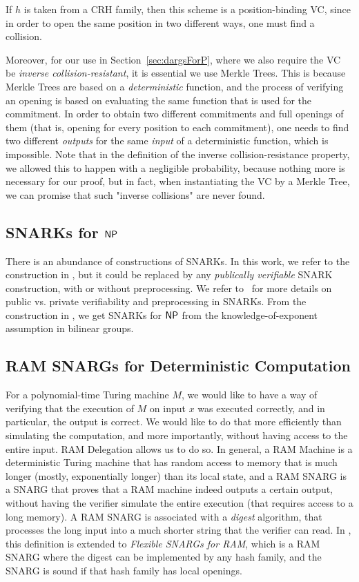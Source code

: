 If $h$ is taken from a CRH family, then this scheme is a position-binding VC, since in order to open the same position in two different ways, one must find a collision.

Moreover, for our use in Section~\ref{sec:dargsForP}, where we also require the VC be \emph{inverse collision-resistant}, it is essential we use Merkle Trees. This is because Merkle Trees are based on a \emph{deterministic} function, and the process of verifying an opening is based on evaluating the same function that is used for the commitment. In order to obtain two different commitments and full openings of them (that is, opening for every position to each commitment), one needs to find two different \emph{outputs} for the same \emph{input} of a deterministic function, which is impossible. Note that in the definition of the inverse collision-resistance property, we allowed this to happen with a negligible probability, because nothing more is necessary for our proof, but in fact, when instantiating the VC by a Merkle Tree, we can promise that such "inverse collisions" are never found.

\subsection{SNARKs for ${\mathsf{NP}}$}\label{app:crypto:SNARKs}
There is an abundance of constructions of SNARKs. In this work, we refer to the construction in \cite{bitansky2013SNARKsLIPs}, but it could be replaced by any \emph{publically verifiable} SNARK construction, with or without preprocessing. We refer to~\cite{bitansky2013SNARKsLIPs, bitansky2013recursive} for more details on public vs. private verifiability and preprocessing in SNARKs.
From the construction in \cite{bitansky2013SNARKsLIPs}, we get SNARKs for ${\mathsf{NP}}$ from the knowledge-of-exponent assumption in bilinear groups. 

\subsection{RAM SNARGs for Deterministic Computation}\label{app:crypto:ramsnargs}
For a polynomial-time Turing machine $M$, we would like to have a way of verifying that the execution of $M$ on input $x$ was executed correctly, and in particular, the output is correct. We would like to do that more efficiently than simulating the computation, and more importantly, without having access to the entire input. RAM Delegation allows us to do so. In general, a RAM Machine is a deterministic Turing machine that has random access to memory that is much longer (mostly, exponentially longer) than its local state, and a RAM SNARG is a SNARG that proves that a RAM machine indeed outputs a certain output, without having the verifier simulate the entire execution (that requires access to a long memory). A RAM SNARG is associated with a \emph{digest} algorithm, that processes the long input into a much shorter string that the verifier can read. In \cite{cryptoeprint:2022/1320}, this definition is extended to \emph{Flexible SNARGs for RAM}, which is a RAM SNARG where the digest can be implemented by any hash family, and the SNARG is sound if that hash family has local openings.

